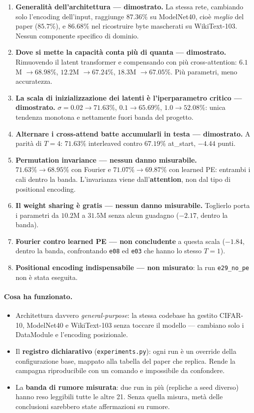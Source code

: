 \documentclass[
  11pt,
]{article}
\begin{document}
\begin{enumerate}
\item \textbf{Generalità dell'architettura --- dimostrato.} La stessa rete, cambiando solo l'encoding dell'input, raggiunge $87.36\%$ su ModelNet40, cioè \emph{meglio} del paper ($85.7\%$), e $86.68\%$ nel ricostruire byte mascherati su WikiText-103. Nessun componente specifico di dominio.
\item \textbf{Dove si mette la capacità conta più di quanta --- dimostrato.} Rimuovendo il latent transformer e compensando con più cross-attention: $6.1$M $\to 68.98\%$, $12.2$M $\to 67.24\%$, $18.3$M $\to 67.05\%$. Più parametri, meno accuratezza.
\item \textbf{La scala di inizializzazione dei latenti è l'iperparametro critico --- dimostrato.} $\sigma = 0.02 \to 71.63\%$, $0.1 \to 65.69\%$, $1.0 \to 52.08\%$: unica tendenza monotona e nettamente fuori banda del progetto.
\item \textbf{Alternare i cross-attend batte accumularli in testa --- dimostrato.} A parità di $T=4$: $71.63\%$ interleaved contro $67.19\%$ at\_start, $-4.44$ punti.
\item \textbf{Permutation invariance --- nessun danno misurabile.} $71.63\% \to 68.95\%$ con Fourier e $71.07\% \to 69.87\%$ con learned PE: entrambi i cali dentro la banda. L'invarianza viene dall'\textbf{attention}, non dal tipo di positional encoding.
\item \textbf{Il weight sharing è gratis --- nessun danno misurabile.} Toglierlo porta i parametri da $10.2$M a $31.5$M senza alcun guadagno ($-2.17$, dentro la banda).
\item \textbf{Fourier contro learned PE --- non concludente} a questa scala ($-1.84$, dentro la banda, confrontando \texttt{e08} ed \texttt{e03} che hanno lo stesso $T=1$).
\item \textbf{Positional encoding indispensabile --- non misurato}: la run \texttt{e29\_no\_pe} non è stata eseguita.
\end{enumerate}

\paragraph{Cosa ha funzionato.}
\begin{itemize}
\item Architettura davvero \emph{general-purpose}: la stessa codebase ha gestito CIFAR-10, ModelNet40 e WikiText-103 senza toccare il modello --- cambiano solo i DataModule e l'encoding posizionale.
\item Il \textbf{registro dichiarativo} (\texttt{experiments.py}): ogni run è un override della configurazione base, mappato alla tabella del paper che replica. Rende la campagna riproducibile con un comando e impossibile da confondere.
\item La \textbf{banda di rumore misurata}: due run in più (repliche a seed diverso) hanno reso leggibili tutte le altre 21. Senza quella misura, metà delle conclusioni sarebbero state affermazioni su rumore.
\end{itemize}
\end{document}
